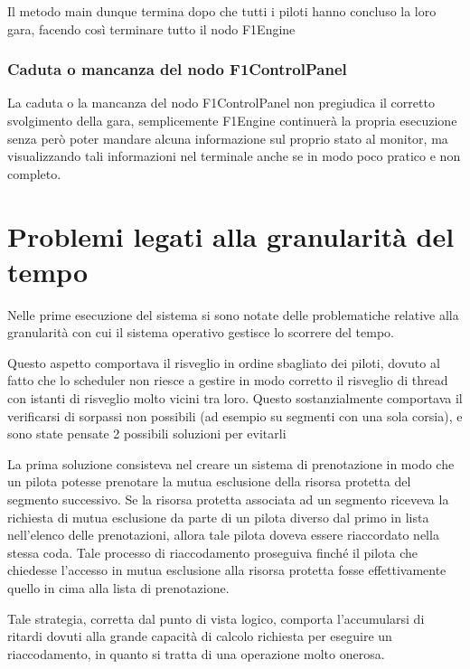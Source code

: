 \documentclass[a4paper,11pt, twoside]{book}
\begin{document}
	  Il metodo main dunque termina dopo che tutti i piloti hanno concluso la loro gara, facendo così
	  terminare tutto il nodo F1Engine
	  
	\subsubsection{Caduta o mancanza del nodo F1ControlPanel}
	  La caduta o la mancanza del nodo F1ControlPanel non pregiudica il corretto svolgimento della gara,
	  semplicemente F1Engine continuerà la propria esecuzione senza però poter mandare alcuna informazione
	  sul proprio stato al monitor, ma visualizzando tali informazioni nel terminale anche se in modo 
	  poco pratico e non completo.
    
    \section{Problemi legati alla granularità del tempo}
    \label{Problemi legati alla granularita del tempo}
      Nelle prime esecuzione del sistema si sono notate delle problematiche relative alla granularità con cui
      il sistema operativo gestisce lo scorrere del tempo.
      
      Questo aspetto comportava il risveglio in ordine sbagliato dei piloti, dovuto al fatto che lo scheduler
      non riesce a gestire in modo corretto il risveglio di thread con istanti di risveglio molto vicini tra loro.
      Questo sostanzialmente comportava il verificarsi di sorpassi non possibili (ad esempio su segmenti con una sola
      corsia), e sono state pensate 2 possibili soluzioni per evitarli
      
      La prima soluzione consisteva nel creare un sistema di prenotazione in modo che un pilota potesse prenotare
      la mutua esclusione della risorsa protetta del segmento successivo. 
      Se la risorsa protetta associata ad un segmento riceveva la richiesta
      di mutua esclusione da parte di un pilota diverso dal primo in lista nell'elenco delle prenotazioni, allora tale pilota
      doveva essere riaccordato nella stessa coda. Tale processo di riaccodamento proseguiva finché il pilota
      che chiedesse l'accesso in mutua esclusione alla risorsa protetta fosse effettivamente quello in cima alla lista
      di prenotazione.
      
      Tale strategia, corretta dal punto di vista logico, comporta l'accumularsi di ritardi dovuti alla grande capacità
      di calcolo richiesta per eseguire un riaccodamento, in quanto si tratta di una operazione molto onerosa.
      
\end{document}
